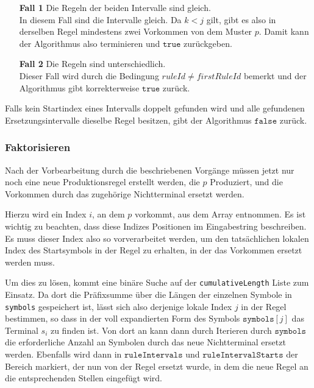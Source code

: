 \begin{enumerate}
	\item[\textbf{Fall 1}] Die Regeln der beiden Intervalle sind gleich.\\
	In diesem Fall sind die Intervalle gleich. Da $k < j$ gilt, gibt es also in derselben Regel mindestens zwei Vorkommen von dem Muster $p$. Damit kann der Algorithmus also terminieren und $\texttt{true}$ zurückgeben.
	\item[\textbf{Fall 2}] Die Regeln sind unterschiedlich.\\
	Dieser Fall wird durch die Bedingung $ruleId \neq firstRuleId$ bemerkt und der Algorithmus gibt korrekterweise $\texttt{true}$ zurück.
\end{enumerate}

Falls kein Startindex eines Intervalls doppelt gefunden wird und alle gefundenen Ersetzungsintervalle dieselbe Regel besitzen, gibt der Algorithmus $\texttt{false}$ zurück.

\subsubsection{Faktorisieren}

Nach der Vorbearbeitung durch die beschriebenen Vorgänge müssen jetzt nur noch eine neue Produktionsregel erstellt werden, die $p$ Produziert, und die Vorkommen durch das zugehörige Nichtterminal ersetzt werden.

Hierzu wird ein Index $i$, an dem $p$ vorkommt, aus dem Array entnommen. Es ist wichtig zu beachten, dass diese Indizes Positionen im Eingabestring beschreiben. Es muss dieser Index also so vorverarbeitet werden, um den tatsächlichen lokalen Index des Startsymbols in der Regel zu erhalten, in der das Vorkommen ersetzt werden muss.

Um dies zu lösen, kommt eine binäre Suche auf der \texttt{cumulativeLength} Liste zum Einsatz. Da dort die Präfixsumme über die Längen der einzelnen Symbole in \texttt{symbols} gespeichert ist, 
lässt sich also derjenige lokale Index $j$ in der Regel bestimmen, so dass in der voll expandierten Form des Symbols $\texttt{symbols}[j]$ das Terminal $s_{i}$ zu finden ist.
Von dort an kann dann durch Iterieren durch $\texttt{symbols}$ die erforderliche Anzahl an Symbolen durch das neue Nichtterminal ersetzt werden.
Ebenfalls wird dann in $\texttt{ruleIntervals}$ und $\texttt{ruleIntervalStarts}$ der Bereich markiert, der nun von der Regel ersetzt wurde, in dem die neue Regel an die entsprechenden Stellen eingefügt wird.

